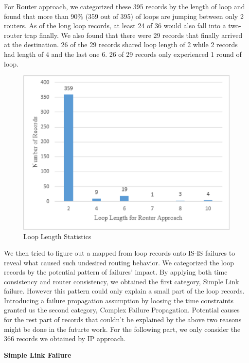 \documentclass[conference, twocolumn, oneside, 10pt]{IEEEtran}
\begin{document}
For Router approach, we categorized these 395 records by the length of loop and found that more than 90\% (359 out of 395) of loops are jumping between only 2 routers. As of the long loop records, at least 24 of 36 would also fall into a two-router trap finally. We also found that there were 29 records that finally arrived at the destination. 26 of the 29 records shared loop length of 2 while 2 records had length of 4 and the last one 6. 26 of 29 records only experienced 1 round of loop.

\begin{figure}[h!]
\centering
\includegraphics[scale=0.4]{plot/loop_length2.eps}
\caption{Loop Length Statistics}
\label{fig:asdf}
\end{figure}

We then tried to figure out a mapped from loop records onto IS-IS failures to reveal what caused such undesired routing behavior. We categorized the loop records by the potential pattern of failures' impact. By applying both time consistency and router consistency, we obtained the first category, Simple Link failure. However this pattern could only explain a small part of the loop records. Introducing a failure propagation assumption by loosing the time constraints granted us the second category, Complex Failure Propagation. Potential causes for the rest part of records that couldn't be explained by the above two reasons might be done in the futurte work. For the following part, we only consider the 366 records we obtained by IP approach.

\textbf{Simple Link Failure}\\
\end{document}
